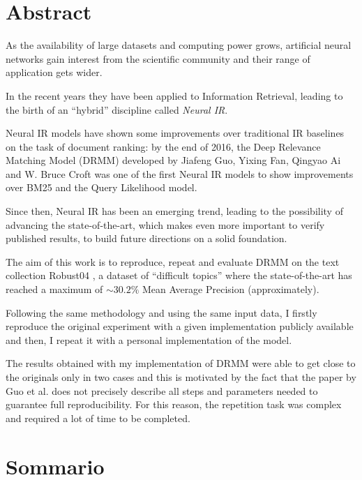 \cleardoublepage
{}
\section*{Abstract}
\thispagestyle{empty}

As the availability of large datasets and computing power grows, artificial neural networks gain interest from the scientific community and their range of application gets wider.

In the recent years they have been applied to Information Retrieval, leading to the birth of an ``hybrid'' discipline called \textit{Neural IR}.

Neural IR models have shown some improvements over traditional IR baselines on the task of document ranking:
by the end of 2016, the Deep Relevance Matching Model (DRMM) \cite{drmm} developed by Jiafeng Guo, Yixing Fan, Qingyao Ai and W. Bruce Croft
was one of the first Neural IR models to show improvements over BM25 and the Query Likelihood model.

Since then, Neural IR has been an emerging trend, leading to the possibility of advancing the state-of-the-art, which makes even more important to verify published results,
to build future directions on a solid foundation.

The aim of this work is to reproduce, repeat and evaluate DRMM on the text collection Robust04 \cite{rob04}, a dataset of ``difficult topics'' where the state-of-the-art
has reached a maximum of $ \sim 30.2\%$ Mean Average Precision (approximately).

Following the same methodology and using the same input data, I firstly reproduce the original experiment with a given implementation publicly available and then,
I repeat it with a personal implementation of the model.

The results obtained with my implementation of DRMM were able to get close to the originals
only in two cases and this is motivated by the fact that the paper by Guo et al. does not precisely
describe all steps and parameters needed to guarantee full reproducibility. For this reason, the repetition task was complex and required a lot of time to be completed.

\bigskip

\cleardoublepage
\section*{Sommario}
\thispagestyle{empty}

